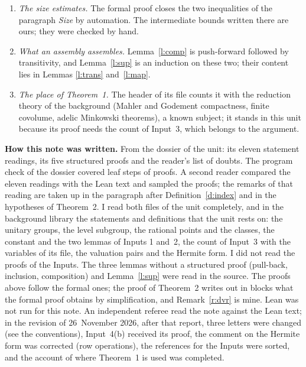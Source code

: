 \documentclass[11pt,a4paper]{article}
\newcommand{\m}[1]{\mbox{$#1$}}        %
\newcommand{\subhead}[1]{\par\addvspace{9pt plus 2pt}\Needspace{4\baselineskip}\noindent\textbf{#1}\enspace\ignorespaces}
\theoremstyle{plainx}
\theoremstyle{uprightx}
\newcommand{\fc}{\mathfrak{c}}
\begin{document}
\begin{enumerate}[label=\textup{\arabic*.},leftmargin=1.6em,itemsep=5pt]
integral adelic matrix as terms and leaves it to Lean to see that they relate the two representatives. The
arrangement written above, \m{h_{\fc}=\gamma h_{\fc'}\kappa} with \m{\gamma=L_{\fc}L_{\fc'}^{-1}} and
\m{\kappa=Q_{\fc'}Q_{\fc}^{-1}}, is read off these terms: the unitarity is proved for the product
\m{L_{\fc}L_{\fc'}^{-1}}, and the integrality for the combination of the two instances of \eqref{e:int} displayed
in the proof, which is \m{Q_{\fc'}Q_{\fc}^{-1}}. The library's lemma on double cosets, which fixes the order, was
not opened: the library is not on the machine where this note was written.
\item \emph{The size estimates.} The formal proof closes the two inequalities of the paragraph \emph{Size} by
automation. The intermediate bounds written there are ours; they were checked by hand.
\item \emph{What an assembly assembles.} Lemma~\ref{l:comp} is push-forward followed by transitivity, and
Lemma~\ref{l:sup} is an induction on these two; their content lies in Lemmas \ref{l:trans} and~\ref{l:map}.
\item \emph{The place of Theorem~1.} The header of its file counts it with the reduction theory of the
background (Mahler and Godement compactness, finite covolume, adelic Minkowski theorems), a known subject; it
stands in this unit because its proof needs the count of Input~3, which belongs to the argument.
\end{enumerate}

\subhead{How this note was written.} From the dossier of the unit: its eleven statement readings, its five
structured proofs and the reader's list of doubts. The program check of the dossier covered \UnitSteps{} leaf steps
of \UnitProofs{} proofs. A second reader compared the eleven readings with the Lean text and sampled the proofs;
the remarks of that reading are taken up in the paragraph after Definition~\ref{d:index} and in the hypotheses
of Theorem~2. I read both files of the unit completely, and in the background library the statements and
definitions that the unit rests on: the unitary groups, the level subgroup, the rational points and the classes,
the constant and the two lemmas of Inputs 1 and~2, the count of Input~3 with the variables of its file, the
valuation pairs and the Hermite form. I did not read the proofs of the Inputs. The three lemmas without a
structured proof (pull-back, inclusion, composition) and Lemma~\ref{l:sup} were read in the source. The proofs
above follow the formal ones; the proof of Theorem~2 writes out in blocks what the formal proof obtains by
simplification, and Remark~\ref{r:dvr} is mine. Lean was not run for this note. An independent referee read the
note against the Lean text; in the revision of 26~November 2026, after that report, three letters were changed
(see the conventions), Input~4(b) received its proof, the comment on the Hermite form was corrected (row
operations), the references for the Inputs were sorted, and the account of where Theorem~1 is used was completed.
\end{document}
